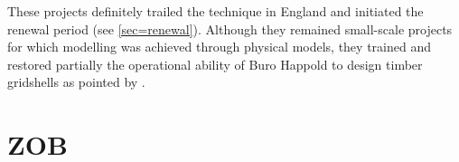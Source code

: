 These projects definitely trailed the technique in England and initiated the renewal period (see \cref{sec=renewal}). Although they remained small-scale projects for which modelling was achieved through physical models, they trained and restored partially the operational ability of Buro Happold to design timber gridshells as pointed by \citet{Harris2003}.

\section{ZOB}
\kant[1-10]





